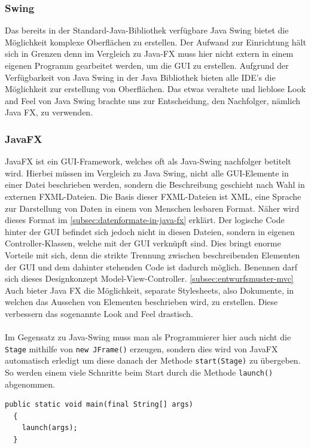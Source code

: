 \subsubsection{Swing}
Das bereits in der Standard-Java-Bibliothek verfügbare Java Swing bietet die Möglichkeit komplexe Oberflächen zu erstellen.
Der Aufwand zur Einrichtung hält sich in Grenzen denn im Vergleich zu Java-FX muss hier nicht extern in einem eigenen Programm gearbeitet werden, um die GUI zu erstellen.
Aufgrund der Verfügbarkeit von Java Swing in der Java Bibliothek bieten alle IDE's die Möglichkeit zur erstellung von Oberflächen.
Das etwas veraltete und lieblose Look and Feel von Java Swing brachte uns zur Entscheidung, den Nachfolger, nämlich Java FX, zu verwenden.
\subsubsection{JavaFX}\label{sssec: JavaFX}
JavaFX ist ein GUI-Framework, welches oft als Java-Swing nachfolger betitelt wird.
Hierbei müssen im Vergleich zu Java Swing, nicht alle GUI-Elemente in einer Datei beschrieben werden, sondern die Beschreibung geschieht nach Wahl in externen FXML-Dateien.
Die Basis dieser FXML-Dateien ist XML, eine Sprache zur Darstellung von Daten in einem von Menschen lesbaren Format.
Näher wird dieses Format im \autoref{subsec:datenformate-in-java-fx} erklärt.
Der logische Code hinter der GUI befindet sich jedoch nicht in diesen Dateien, sondern in eigenen Controller-Klassen, welche mit der GUI verknüpft sind.
Dies bringt enorme Vorteile mit sich, denn die strikte Trennung zwischen beschreibenden Elementen der GUI
und dem dahinter stehenden Code ist dadurch möglich.
Benennen darf sich dieses Designkonzept Model-View-Controller. \autoref{subsec:entwurfsmuster-mvc}\\
Auch bieter Java FX die Möglichkeit, separate Stylesheets, also Dokumente, in welchen das Aussehen von Elementen beschrieben wird, zu erstellen.
Diese verbessern das sogenannte Look and Feel drastisch.\\\\
Im Gegensatz zu Java-Swing muss man als Programmierer hier auch nicht die \lstinline[style=java]{Stage} mithilfe von \lstinline[style=java]{new JFrame()} erzeugen, sondern dies wird von JavaFX automatisch erledigt um diese danach der Methode \lstinline[style=java]{start(Stage)} zu übergeben.
So werden einem viele Schnritte beim Start durch die Methode \lstinline[style=java]{launch()} abgenommen.
\begin{lstlisting}[style=java,caption=Java-Codebeispiel,label=commThreadSync]
  public static void main(final String[] args)
  {
    launch(args);
  }
\end{lstlisting}
